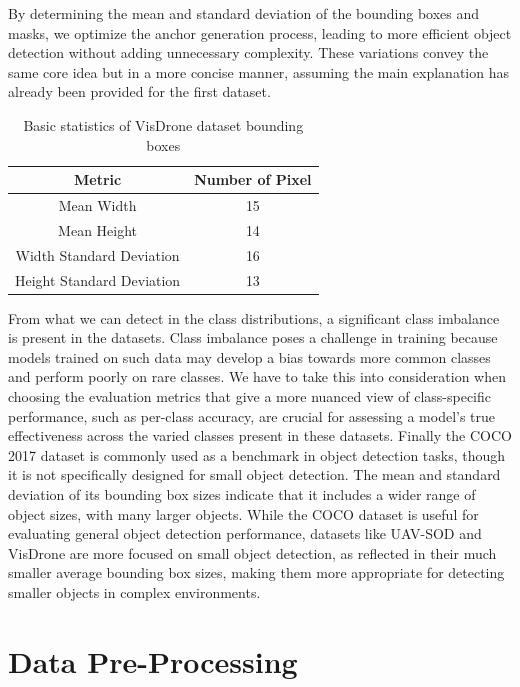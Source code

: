 By determining the mean and standard deviation of the bounding boxes and masks, we optimize the anchor generation process, leading to more efficient object detection 
without adding unnecessary complexity. These variations convey the same core idea but in a more concise manner, assuming the main explanation has already been 
provided for the first dataset.

\begin{table}[h]
    \centering
    \begin{tabular}{|c|c|}
        \hline
        Metric                     & Number of Pixel   \\ \hline
        Mean Width                 & 15                \\ \hline
        Mean Height                & 14                \\ \hline
        Width Standard Deviation   & 16                \\ \hline
        Height Standard Deviation  & 13                \\ \hline
    \end{tabular}
    \caption{Basic statistics of VisDrone dataset bounding boxes}
    \label{tab:vis_bboxes}
\end{table}


\newpage
From what we can detect in the class distributions, a significant class imbalance is present in the datasets. Class imbalance poses a 
challenge in training because models trained on such data may develop a bias towards more common classes and perform poorly on rare classes. 
We have to take this into consideration when choosing the evaluation metrics that give a more nuanced view of class-specific performance, such as 
per-class accuracy, are crucial for assessing a model’s true effectiveness across the varied classes present in these datasets.
Finally the COCO 2017 dataset is commonly used as a benchmark in object detection tasks, though it is not specifically designed for small object detection. 
The mean and standard deviation of its bounding box sizes indicate that it includes a wider range of object sizes, with many larger objects. While the COCO dataset 
is useful for evaluating general object detection performance, datasets like UAV-SOD and VisDrone are more focused on small object detection, as reflected in 
their much smaller average bounding box sizes, making them more appropriate for detecting smaller objects in complex environments.

\newpage
\section{Data Pre-Processing}

